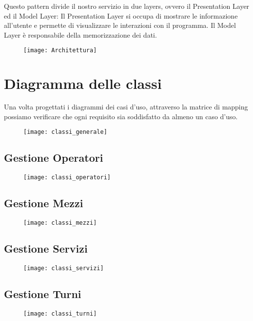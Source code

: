 \documentclass[green, fancy, 11pt]{elegantbook}
\begin{document}
Questo pattern divide il nostro servizio in due layers, ovvero il Presentation Layer ed il Model Layer:
Il Presentation Layer si occupa di mostrare le informazione all'utente e permette di visualizzare le interazioni con il programma.
Il Model Layer è responsabile della memorizzazione dei dati.
\\
\begin{figure}[H]
	\texttt{[image: Architettura]}
\end{figure}

\newpage
\section{Diagramma delle classi}
Una volta progettati i diagrammi dei casi d'uso, attraverso la matrice di mapping possiamo verificare che ogni requisito sia soddisfatto da almeno un caso d'uso.
\\
\begin{figure}[H]
	\texttt{[image: classi\_generale]}
\end{figure}
\newpage

\subsection{Gestione Operatori}
\begin{figure}[H]
	\texttt{[image: classi\_operatori]}
\end{figure}
\subsection{Gestione Mezzi}
\begin{figure}[H]
	\texttt{[image: classi\_mezzi]}
\end{figure}
\newpage

\subsection{Gestione Servizi}
\begin{figure}[H]
	\texttt{[image: classi\_servizi]}
\end{figure}
\subsection{Gestione Turni}
\begin{figure}[H]
	\texttt{[image: classi\_turni]}
\end{figure}
\newpage
\end{document}
